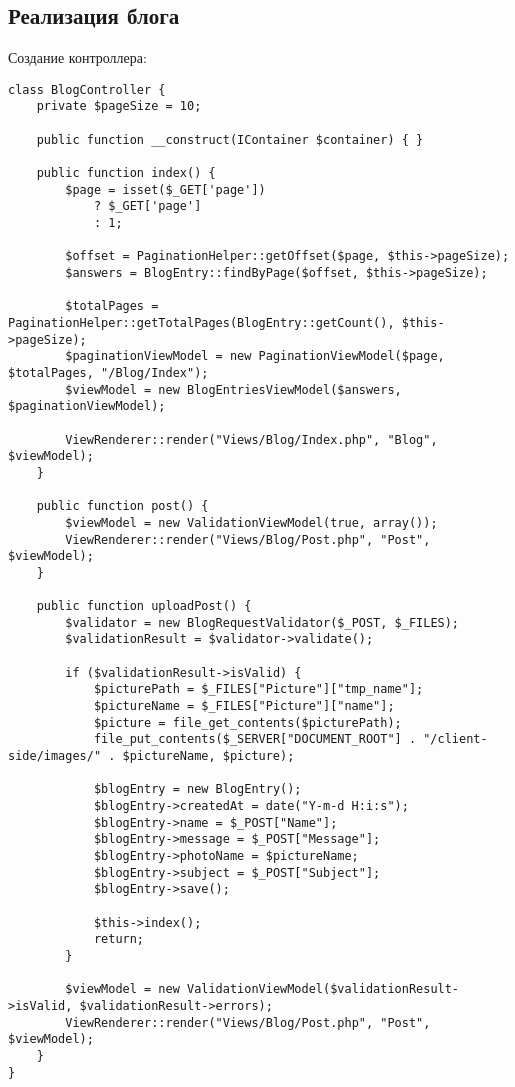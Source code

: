 \documentclass[a4paper,14pt]{extarticle}
\begin{document}
\subsection{Реализация блога}
Создание контроллера:
\begin{lstlisting}
class BlogController {
    private $pageSize = 10;

    public function __construct(IContainer $container) { }

    public function index() {
        $page = isset($_GET['page'])
            ? $_GET['page']
            : 1;

        $offset = PaginationHelper::getOffset($page, $this->pageSize);
        $answers = BlogEntry::findByPage($offset, $this->pageSize);

        $totalPages = PaginationHelper::getTotalPages(BlogEntry::getCount(), $this->pageSize);
        $paginationViewModel = new PaginationViewModel($page, $totalPages, "/Blog/Index");
        $viewModel = new BlogEntriesViewModel($answers, $paginationViewModel);

        ViewRenderer::render("Views/Blog/Index.php", "Blog", $viewModel);
    }

    public function post() {
        $viewModel = new ValidationViewModel(true, array());
        ViewRenderer::render("Views/Blog/Post.php", "Post", $viewModel);
    }

    public function uploadPost() {
        $validator = new BlogRequestValidator($_POST, $_FILES);
        $validationResult = $validator->validate();

        if ($validationResult->isValid) {
            $picturePath = $_FILES["Picture"]["tmp_name"];
            $pictureName = $_FILES["Picture"]["name"];
            $picture = file_get_contents($picturePath);
            file_put_contents($_SERVER["DOCUMENT_ROOT"] . "/client-side/images/" . $pictureName, $picture);

            $blogEntry = new BlogEntry();
            $blogEntry->createdAt = date("Y-m-d H:i:s");
            $blogEntry->name = $_POST["Name"];
            $blogEntry->message = $_POST["Message"];
            $blogEntry->photoName = $pictureName;
            $blogEntry->subject = $_POST["Subject"];
            $blogEntry->save();

            $this->index();
            return;
        }

        $viewModel = new ValidationViewModel($validationResult->isValid, $validationResult->errors);
        ViewRenderer::render("Views/Blog/Post.php", "Post", $viewModel);
    }
}
\end{lstlisting}
\end{document}
